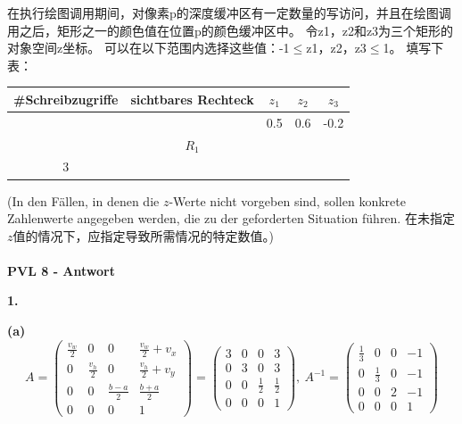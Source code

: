 \documentclass[fleqn]{article}
\begin{document}
 在执行绘图调用期间，对像素p的深度缓冲区有一定数量的写访问，并且在绘图调用之后，矩形之一的颜色值在位置p的颜色缓冲区中。 令z1，z2和z3为三个矩形的对象空间z坐标。 可以在以下范围内选择这些值：-1$\leq$z1，z2，z3$\leq$1。 填写下表：

\begin{center}
    \begin{tabular}{|c|c|c|c|c|}
        \hline
        \textbf{\#Schreibzugriffe} & \textbf{sichtbares Rechteck}&\qquad$z_1$\qquad\qquad&\qquad$z_2$\qquad\qquad&\qquad$z_3$\qquad\qquad\\
        \hline
        &&0.5&0.6&-0.2\\
        \hline
        &$R_1$&&&\\
        \hline
        3&&&&\\
        \hline
    \end{tabular}
\end{center}

(In den Fällen, in denen die $z$-Werte nicht vorgeben sind, sollen konkrete Zahlenwerte angegeben werden, die zu der geforderten Situation führen. 在未指定$ z $值的情况下，应指定导致所需情况的特定数值。)
\\
\\
\noindent\textbf{PVL 8 - Antwort}

\indent\textbf{1.}

\indent\indent\textbf{(a)}
$$A = 
\begin{pmatrix}
    \frac{v_w}{2} & 0 & 0 & \frac{v_w}{2}+v_x \\
    0 & \frac{v_h}{2} & 0 & \frac{v_h}{2}+v_y \\
    0 & 0 & \frac{b-a}{2} & \frac{b+a}{2} \\
    0 & 0 & 0 & 1
\end{pmatrix}=
\begin{pmatrix}
    3 & 0 & 0 & 3 \\
    0 & 3 & 0 & 3\\
    0 & 0 & \frac{1}{2} & \frac{1}{2}\\
    0 & 0 & 0 & 1
\end{pmatrix}
, \
A^{-1}=
\begin{pmatrix}
    \frac{1}{3} & 0 & 0 & -1\\
    0 & \frac{1}{3} & 0 & -1\\
    0&0&2&-1\\
    0&0&0&1
\end{pmatrix}
$$
\end{document}
